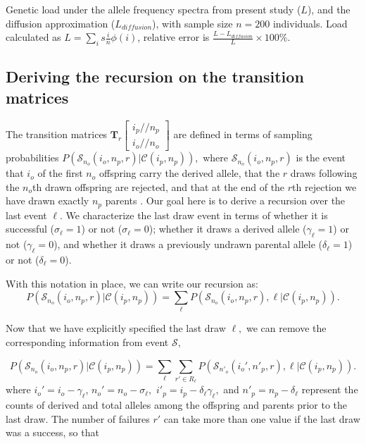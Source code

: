 \documentclass[review,nonatbib]{elsarticle}
\newcommand{\dslash}{/\!\!/}
\newcommand{\Coalc}[4]{\begin{bmatrix}#1\dslash #2 \\ #3\dslash #4 \end{bmatrix}}
\newcommand{\CC}{\mathcal{C}}
\newcommand{\ms}{\mathcal{S}}
\begin{document}
\begin{table}
    \caption{\label{tab_apx_load} Genetic load under the allele frequency
    spectra from present study ($L$), and the diffusion approximation
    ($L_{diffusion}$), with sample size $n=200$ individuals. Load calculated as
    $L=\sum_i s \frac{i}{n} \phi(i)$, relative error is
    $\frac{L-L_{diffusion}}{L}\times100\%$. }

\end{table}

\subsection{Deriving the recursion on the transition matrices}
\label{subsec_apx_tpm_deriv}

The transition matrices $\mathbf{T}_{r}\Coalc{i_p}{n_p}{i_o}{n_o}$ are defined in terms of sampling
probabilities $P(\ms_{n_o}(i_o, n_p, r) | \CC{(i_p,n_p)} ),$ where $\ms_{n_o}(i_o,n_p, r)$ is the
event that $i_o$ of the first $n_o$ offspring carry the derived allele, that the $r$
draws following the $n_o$th drawn offspring are rejected, and that at the end of the $r$th
rejection we have drawn exactly $n_p$ parents . Our goal here is to derive a recursion
over the last event $\ell$. We characterize the last draw event in terms of whether it is
successful ($\sigma_\ell=1$) or not ($\sigma_\ell=0$); whether it draws a derived allele
($\gamma_\ell=1$) or not ($\gamma_\ell=0$), and whether it draws a previously undrawn parental
allele ($\delta_\ell=1$) or not ($\delta_\ell=0$).

With this notation in place, we can write our recursion as:
 \begin{equation}
  P( \ms_{n_o}(i_o, n_p, r) | \CC{(i_p,n_p)} ) = \sum_\ell P( \ms_{n_o}(i_o, n_p, r),\ell | \CC(i_p,n_p) ) .
 \end{equation}

Now that we have explicitly specified the last draw $\ell,$ we can remove the corresponding
information from event $\ms,$

\begin{equation}
  P(\ms_{n_o}(i_o, n_p, r) | \CC{(i_p,n_p)} ) = \sum_\ell \sum_{r' \in R_\ell} P(\ms_{n'_o}(i_o',
  n'_p, r),\ell | \CC{(i_p,n_p)} ) .
\end{equation}
where $i_o' = i_o-\gamma_\ell$,  $n_o' = n_o-\sigma_\ell,$ $i'_p= i_p - \delta_\ell \gamma_\ell,$  and $n'_p  = n_p - \delta_\ell$ represent the
counts of derived and total alleles among the offspring and parents prior to the last draw.
 The number of failures $r'$ can take more than one value if the last draw was a success,
so that
\end{document}
